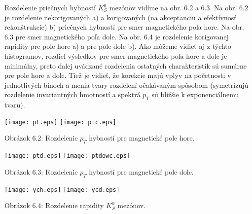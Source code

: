 Rozdelenie priečnych hybností $K^{0}_{S}$ mezónov vidíme na obr. 6.2 a 6.3.
Na  obr. 6.2  je rozdelenie nekorigovaných a) a korigovaných (na
akceptanciu a efektívnosť rekonštrukcie) b) priečnych hybností pre
smer magnetického poľa hore. Na obr. 6.3 pre smer magnetického poľa dole.
Na obr. 6.4 je rozdelenie korigovanej rapidity pre pole hore a) a pre pole
dole b).  Ako môžeme vidieť aj z týchto histogramov, rozdiel výsledkov pre
smer magnetického poľa hore a dole je minimálny, preto  ďalej uvádzané
rozdelenia ostatných charakteristík sú sumárne  pre pole hore a
dole.  Tiež je vidieť, že korekcie majú  vplyv na početnosti v
jednotlivých binoch a menia tvary rozdelení očakávaným spôsobom (symetrizujú
rozdelenie invariantných hmotností a spektrá $p_{T}$ sú bližšie k
exponenciálnemu tvaru).


\newpage
\begin{center}
  \texttt{[image: pt.eps]}
  \texttt{[image: ptc.eps]}
\end{center}
\begin{center}
  Obrázok 6.2: Rozdelenie $p_{T}$ hybností pre magnetické pole hore.
\end{center}
\begin{center}
  \texttt{[image: ptd.eps]}
  \texttt{[image: ptdowc.eps]}
\end{center}
\begin{center}
  Obrázok 6.3: Rozdelenie $p_{T}$ hybností pre magnetické pole dole.
\end{center}

\begin{center}
  \texttt{[image: ych.eps]}
  \texttt{[image: ycd.eps]}

\end{center}
\begin{center}
  Obrázok 6.4: Rozdelenie rapidity $K^{0}_{S}$ mezónov.
\end{center}


